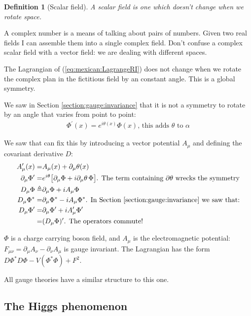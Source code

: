 \documentclass[]{article}
\newtheorem{defn}[thm]{Definition}
\begin{document}
\begin{defn}[Scalar field]
	A scalar field is one which doesn't change when we rotate space.
\end{defn}

A complex number is a means of talking about pairs of numbers. Given two real fields I can assemble them into a single complex field. Don't confuse a complex scalar field with a vector field: we are dealing with different spaces.

The Lagrangian of (\ref{eq:mexican:LagrangeRI})  does not change when we rotate the complex plan in the fictitious field by an constant angle. This is a global symmetry.

We saw in Section \ref{section:gauge:invariance} that it is not a  symmetry to rotate by an angle that varies from point to point:
\begin{align*}
	\Phi^\prime (x) = e^{i\theta(x)} \Phi(x) \text{, this adds $\theta$ to $\alpha$}
\end{align*}

We saw that can fix this by introducing a vector potential $A_\mu$ and defining the covariant derivative $D$:
\begin{align*}
	A^\prime_\mu(x) =& A_\mu(x) + \partial_\mu \theta(x)\\
	\partial_\mu \Phi^\prime =& e^{i\theta} \big[\partial_\mu \Phi + i \partial_\mu \theta \,\Phi\big] \text{. The term containing $\partial \theta$  wrecks the symmetry}\\
	D_\mu \Phi \triangleq& \partial_\mu \Phi + i A_\mu \Phi\\
	D_\mu \Phi^* =& \partial_\mu \Phi^* - i A_\mu \Phi^* \text{. In Section \ref{section:gauge:invariance} we saw that:}\\
	D_\mu \Phi^\prime =& \partial_\mu \Phi^\prime + i A^\prime_\mu \Phi^\prime \\
	=& (D_\mu \Phi)^\prime \text{. The operators commute!}
\end{align*}

$\Phi$ is a charge carrying boson field, and $A_\mu$ is the electromagnetic potential: $F_{\mu\nu}=\partial_\mu A_\nu-\partial_\nu A_\mu$ is gauge invariant. The Lagrangian has the form $D\Phi^* D\Phi -V(\Phi^*\Phi) +F^2$. 

All gauge theories have a similar structure to this one.

\subsection{The Higgs phenomenon}
\end{document}
